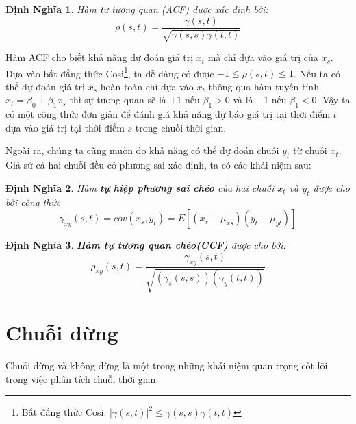 \documentclass[twoside,12pt]{Latex/Classes/PhDthesisPSnPDF}
\newtheorem{defi}{Định Nghĩa}[chapter]
\begin{document}
\begin{defi}
	Hàm tự tương quan (ACF)\cite{tsa3} được xác định bởi:
	\begin{equation}
		\rho(s,t) = \frac{\gamma(s,t)}{\sqrt{\gamma(s,s)\gamma(t,t)}}
	\end{equation}
\end{defi}
Hàm ACF cho biết khả năng dự đoán giá trị $x_t$ mà chỉ dựa vào giá trị của $x_s$. Dựa vào bất đẳng thức Cosi\footnote{Bất đẳng thức Cosi: $|\gamma(s,t)|^{2} \leq \gamma(s,s)\gamma(t,t)$}, ta dễ dàng có được $-1\leq \rho(s,t)\leq 1$. Nếu ta có thể dự đoán giá trị $x_{s}$ hoàn toàn chỉ dựa vào $x_t$ thông qua hàm tuyến tính $x_t = \beta_0 + \beta_1x_s$ thì sự tương quan sẽ là $+1$ nếu $\beta_1 > 0$ và là $-1$ nếu $\beta_1<0$. Vậy ta có một công thức đơn giản để đánh giá khả năng dự báo giá trị tại thời điểm $t$ dựa vào giá trị tại thời điểm $s$ trong chuỗi thời gian.

Ngoài ra, chúng ta cũng muốn đo khả năng có thể dự đoán chuỗi $y_t$ từ chuỗi $x_t$. Giả sử cả hai chuỗi đều có phương sai xác định, ta có các khái niệm sau:
\begin{defi}
Hàm \textbf{tự hiệp phương sai chéo} của hai chuỗi $x_t$ và $y_t$ được cho bởi công thức
\begin{equation}
		\gamma_{xy}(s,t) = cov(x_s,y_t) = E[(x_s - \mu_{xs})(y_t - \mu_{yt} )]
\end{equation}
\end{defi}
\begin{defi}
\textbf{Hàm tự tương quan chéo(CCF)}\cite{tsa3} được cho bởi:
	\begin{equation}
		\rho_{xy}(s,t) = \frac{\gamma_{xy}(s,t)}{\sqrt{(\gamma_s(s,s))(\gamma_y(t,t))}}
	\end{equation}
\end{defi}

\section{Chuỗi dừng} \label{sec:sta}
Chuỗi dừng và không dừng là một trong những khái niệm quan trọng cốt lõi trong việc phân tích chuỗi thời gian.
\end{document}
